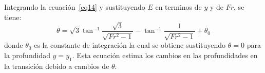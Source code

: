 \documentclass[11pt, oneside]{article}
\begin{document}
Integrando la ecuaci\'on~\ref{eq14} y sustituyendo $E$ en terminos de $y$ y de $Fr$, se tiene:
\begin{equation}
   \theta = \sqrt{3}\tan^{-1} \frac{\sqrt{3}}{\sqrt{Fr^2 - 1}} - \tan^{-1} \frac{1}{\sqrt{Fr^2 -1}} + \theta_0
    \label{eq15}
\end{equation}
donde $\theta_0$ es la constante de integraci\'on la cual se obtiene sustituyendo $\theta = 0$ para la profundidad $y = y_1$. Esta ecuaci\'on estima los cambios en las profundidades en la transici\'on debido a cambios de $\theta$. 



\end{document}
